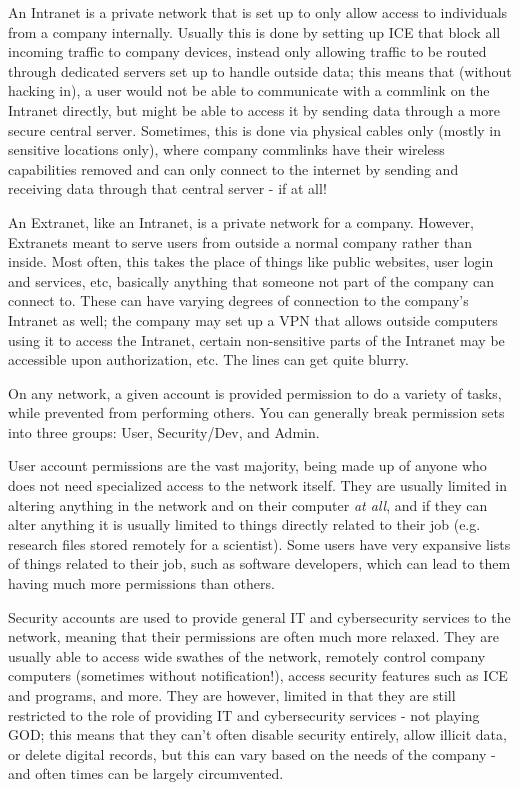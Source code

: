 \begin{multicols*}{3}
	An Intranet is a private network that is set up to only allow access to individuals from a company internally. Usually this is done by setting up ICE that block all incoming traffic to company devices, instead only allowing traffic to be routed through dedicated servers set up to handle outside data; this means that (without hacking in), a user would not be able to communicate with a commlink on the Intranet directly, but might be able to access it by sending data through a more secure central server. Sometimes, this is done via physical cables only (mostly in sensitive locations only), where company commlinks have their wireless capabilities removed and can only connect to the internet by sending and receiving data through that central server - if at all!
	
	An Extranet, like an Intranet, is a private network for a company. However, Extranets meant to serve users from outside a normal company rather than inside. Most often, this takes the place of things like public websites, user login and services, etc, basically anything that someone not part of the company can connect to. These can have varying degrees of connection to the company's Intranet as well; the company may set up a VPN that allows outside computers using it to access the Intranet, certain non-sensitive parts of the Intranet may be accessible upon authorization, etc. The lines can get quite blurry.
	
	On any network, a given account is provided permission to do a variety of tasks, while prevented from performing others. You can generally break permission sets into three groups: User, Security/Dev, and Admin. 
	
	User account permissions are the vast majority, being made up of anyone who does not need specialized access to the network itself. They are usually limited in altering anything in the network and on their computer \textit{at all}, and if they can alter anything it is usually limited to things directly related to their job (e.g. research files stored remotely for a scientist). Some users have very expansive lists of things related to their job, such as software developers, which can lead to them having much more permissions than others. 
	
	Security accounts are used to provide general IT and cybersecurity services to the network, meaning that their permissions are often much more relaxed. They are usually able to access wide swathes of the network, remotely control company computers (sometimes without notification!), access security features such as ICE and programs, and more. They are however, limited in that they are still restricted to the role of providing IT and cybersecurity services - not playing GOD; this means that they can't often disable security entirely, allow illicit data, or delete digital records, but this can vary based on the needs of the company - and often times can be largely circumvented.
	

\end{multicols*}
